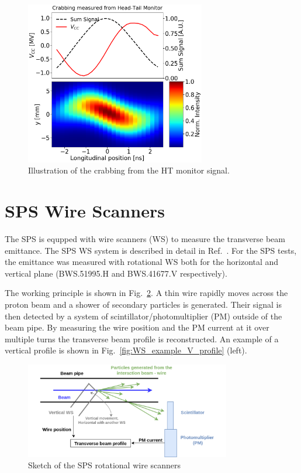 \begin{figure}[!h]
   \centering         
   \includegraphics[width=0.7\textwidth]{images/Ch4/HT_crabVoltage__20180530_135105_crabbing_only.png}
       \caption{Illustration of the crabbing from the HT monitor signal.}
       \label{fig:crabbing_reconstruction_HT_monitor}
\end{figure}
   



\section{SPS Wire Scanners}

The SPS is equpped with wire scanners (WS) to measure the transverse beam emittance. The SPS WS system is described in detail in Ref.~\cite{BOSSER1985475, Berrig:1972478}. For the SPS tests, the emittance was measured with rotational WS both for the horizontal and vertical plane (BWS.51995.H and BWS.41677.V respectively).

The working principle is shown in Fig.~\ref{fig:SPS_WS_ROT}. A thin wire rapidly moves across the proton beam and a shower of secondary particles is generated. Their signal is then detected by a system of scintillator/photomultiplier (PM) outside of the beam pipe. By measuring the wire position and the PM current at it over multiple turns the transverse beam profile is reconstructed. An example of a vertical profile is shown in Fig.~\ref{fig:WS_example_V_profile} (left).


\begin{figure}[!h]
   \centering         
   \includegraphics[width=0.8\textwidth]{images/Ch4/Wire_scanner.png}
       \caption{Sketch of the SPS rotational wire scanners~\cite{Berrig:1972478}}
       \label{fig:SPS_WS_ROT}
\end{figure}



